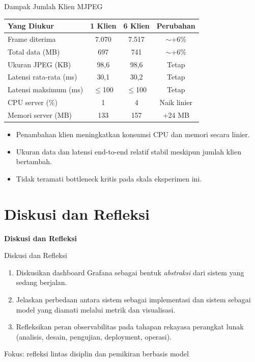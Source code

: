 \documentclass[aspectratio=169, table]{beamer}
\begin{document}
\begin{frame}{Dampak Jumlah Klien MJPEG}
	\vspace{20pt}
	\centering
	\setlength{\arrayrulewidth}{0.8pt}
	\begin{tabular}{|l|c|c|c|}
	\hline
	\textbf{Yang Diukur} & \textbf{1 Klien} & \textbf{6 Klien} & \textbf{Perubahan} \\
	\hline
	Frame diterima & 7.070 & 7.517 & $\sim$+6\% \\
	\hline
	Total data (MB) & 697 & 741 & $\sim$+6\% \\
	\hline
	Ukuran JPEG (KB) & 98,6 & 98,6 & Tetap \\
	\hline
	Latensi rata-rata (ms) & 30,1 & 30,2 & Tetap \\
	\hline
	Latensi maksimum (ms) & $\le$100 & $\le$100 & Tetap \\
	\hline
	CPU server (\%) & 1 & 4 & Naik linier \\
	\hline
	Memori server (MB) & 133 & 157 & +24 MB \\
	\hline
	\end{tabular}
	
	\vspace{6pt}
	\begin{itemize}
		\item Penambahan klien meningkatkan konsumsi CPU dan memori secara linier.
		\item Ukuran data dan latensi end-to-end relatif stabil meskipun jumlah klien bertambah.
		\item Tidak teramati bottleneck kritis pada skala eksperimen ini.
	\end{itemize}
\end{frame}

	\section{Diskusi dan Refleksi}
	
	\begin{frame}{\hfill}
		\centering
		\Huge{\textbf{Diskusi dan Refleksi}}
	\end{frame}

\begin{frame}{Diskusi dan Refleksi}
	\vspace{20pt}
	\begin{enumerate}
		\item Diskusikan dashboard Grafana sebagai bentuk \emph{abstraksi} dari sistem yang sedang berjalan.
		\item Jelaskan perbedaan antara sistem sebagai implementasi
		      dan sistem sebagai model yang diamati melalui metrik dan visualisasi.
		\item Refleksikan peran observabilitas pada tahapan rekayasa perangkat lunak
		      (analisis, desain, pengujian, deployment, operasi).
	\end{enumerate}
	
	\vspace{6pt}
	{\footnotesize Fokus: refleksi lintas disiplin dan pemikiran berbasis model}
\end{frame}
\end{document}

